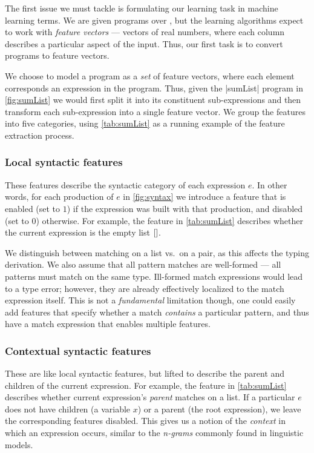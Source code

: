 The first issue we must tackle is formulating our learning task in
machine learning terms.
%
We are given programs over \lang, but the learning algorithms expect to work
with \emph{feature vectors} --- vectors of real numbers, where each
column describes a particular aspect of the input.
%
Thus, our first task is to convert programs to feature vectors.

We choose to model a program as a \emph{set} of feature vectors, where
each element corresponds an expression in the program.
%
Thus, given the |sumList| program in \autoref{fig:sumList} we
would first split it into its constituent sub-expressions and then
transform each sub-expression into a single feature vector.
%
We group the features into five categories, using \autoref{tab:sumList}
as a running example of the feature extraction process.

\subsubsection{Local syntactic features}
These features describe the syntactic category of each expression $e$.
%
In other words, for each production of $e$ in \autoref{fig:syntax} we
introduce a feature that is enabled (set to $1$) if the expression was
built with that production, and disabled (set to $0$) otherwise.
%
For example, the \IsNil feature in \autoref{tab:sumList} describes
whether the current expression is the empty list $\mathtt{[]}$.

We distinguish between matching on a list vs.\ on a pair, as this
affects the typing derivation.
%
We also assume that all pattern matches are well-formed --- \ie all
patterns must match on the same type.
%
Ill-formed match expressions would lead to a type error; however, they
are already effectively localized to the match expression itself.
%
This is not a \emph{fundamental} limitation though, one could easily add
features that specify whether a match \emph{contains} a particular
pattern, and thus have a match expression that enables multiple
features.

\subsubsection{Contextual syntactic features}
These are like local syntactic features, but lifted to describe the
parent and children of the current expression.
%
For example, the \IsCaseListP feature in \autoref{tab:sumList} describes
whether current expression's \emph{parent} matches on a list.
%
If a particular $e$ does not have children (\eg a variable $x$) or a
parent (\ie the root expression), we leave the corresponding features
disabled.
%
This gives us a notion of the \emph{context} in which an expression
occurs, similar to the \emph{n-grams} commonly found in linguistic
models.

